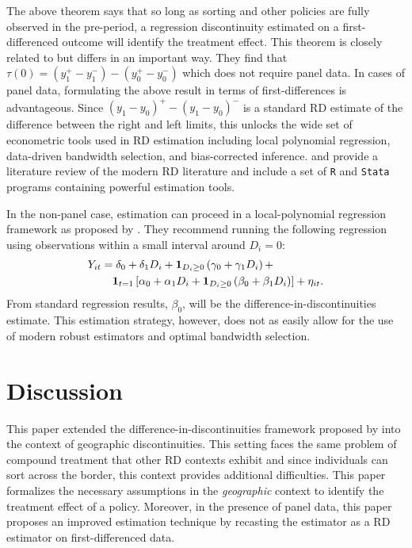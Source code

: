 \documentclass[12pt]{article}
\begin{document}
The above theorem says that so long as sorting and other policies are fully observed in the pre-period, a regression discontinuity estimated on a first-differenced outcome will identify the treatment effect. This theorem is closely related to \citet{Grembi_Nannicini_Troiano_2016} but differs in an important way. They find that $\tau(0) = (y_1^+ - y_1^-) - (y_0^+ - y_0^-)$ which does not require panel data. In cases of panel data, formulating the above result in terms of first-differences is advantageous. Since $(y_1 - y_0)^+ - (y_1 - y_0)^-$ is a standard RD estimate of the difference between the right and left limits, this  unlocks the wide set of econometric tools used in RD estimation including local polynomial regression, data-driven bandwidth selection, and bias-corrected inference. \citet{Cattaneo_Idrobo_Titiunik_2019} and \citet{Cattaneo_Idrobo_Titiunik_2020} provide a literature review of the modern RD literature and include a set of \texttt{R} and \texttt{Stata} programs containing powerful estimation tools.


In the non-panel case, estimation can proceed in a local-polynomial regression framework as proposed by \citet{Grembi_Nannicini_Troiano_2016}. They recommend running the following regression using observations within a small interval around $D_i = 0$: 
\begin{align*}
    Y_{it} &= \delta_0 + \delta_1 D_{i} + \mathbf{1}_{D_i \geq 0} \left( \gamma_0 + \gamma_1 D_i \right) + \\ 
    &\quad \mathbf{1}_{t = 1} \left[ \alpha_0 + \alpha_1 D_{i} + \mathbf{1}_{D_i \geq 0} \left( \beta_0 + \beta_1 D_i \right) \right] + \eta_{it}.
\end{align*}
From standard regression results, $\beta_0$, will be the difference-in-discontinuities estimate. This estimation strategy, however, does not as easily allow for the use of modern robust estimators and optimal bandwidth selection.


\section{Discussion}

This paper extended the difference-in-discontinuities framework proposed by \citet{Grembi_Nannicini_Troiano_2016} into the context of geographic discontinuities. This setting faces the same problem of compound treatment that other RD contexts exhibit and since individuals can sort across the border, this context provides additional difficulties. This paper formalizes the necessary assumptions in the \emph{geographic} context to identify the treatment effect of a policy. Moreover, in the presence of panel data, this paper proposes an improved estimation technique by recasting the estimator as a RD estimator on first-differenced data. 









\setlength{\bibsep}{0.0pt}

\end{document}
